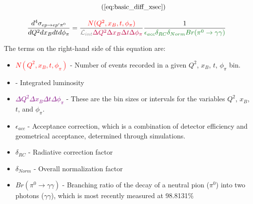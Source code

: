         \begin{equation*}
          \recallLabel{eq:basic_diff_xsec}
        \end{equation*}
  
       
             \begin{equation}\labelAndRemember{eq:DVPiPCrossSection_exp}
                   { \frac{    d^4\sigma_{  ep \rightarrow ep'\pi^0}   } {dQ^2dx_Bdtd\phi_{\pi}} 
                        =   \frac{ \textcolor{red}{ N(Q^2,x_B,t,\phi_{\pi})}} {\Lumiint \textcolor{purple}{ \Delta Q^2 \Delta x_B \Delta t \Delta \phi_{\pi}}} 
                        \frac{1}{\textcolor{correctionfactors}{\epsilon_{acc} \delta_{RC} \delta_{Norm} Br(\pi^0\rightarrow\gamma\gamma)}}}
             \end{equation}      
        
        The terms on the right-hand side of this equation are: 
        \begin{itemize}
        \item \textcolor{red}{$N(Q^2,x_B,t,\phi_{\pi})$} - Number of events recorded in a given $Q^2$, $x_B$, $t$, $\phi_{\pi}$ bin.
        
        \item \Lumiint - Integrated luminosity
        
        \item \textcolor{purple}{$\Delta Q^2 \Delta x_B \Delta t \Delta \phi_{\pi}$} - These are the bin sizes or intervals for the variables $Q^2$, $x_B$, $t$, and $\phi_{\pi}$.
        
        \item \textcolor{correctionfactors}{$\epsilon_{acc}$} - Acceptance correction, which is a combination of detector efficiency and geometrical acceptance, determined through simulations. 
        
        \item \textcolor{correctionfactors}{$\delta_{RC}$} - Radiative correction factor
        
        \item \textcolor{correctionfactors}{$\delta_{Norm}$} - Overall normalization factor
        
        \item \textcolor{correctionfactors}{$Br(\pi^0\rightarrow\gamma\gamma)$} - Branching ratio of the decay of a neutral pion ($\pi^0$) into two photons ($\gamma\gamma$), which is most recently measured at 98.8131\%  \cite{Husek2019PreciseDecay}
        \end{itemize}

